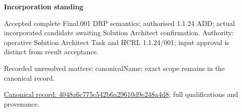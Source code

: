 \par\medskip\textbf{Incorporation standing}\par


Accepted complete Final.001 DRP semantics; authorised 1.1.24 ADD; actual incorporated candidate awaiting Solution Architect confirmation. Authority: operative Solution Architect Task and HCRL 1.1.24/001; input approval is distinct from result acceptance.


{\small Recorded unresolved matters: canonicalName; exact scope remains in the canonical record.}\par
{\footnotesize \href{../../../../../../../continuum/technology/system-software/4048a6c775c542b6a29610d9e248a4d8.md}{Canonical record: 4048a6c775c542b6a29610d9e248a4d8}; full qualifications and provenance.}\par
